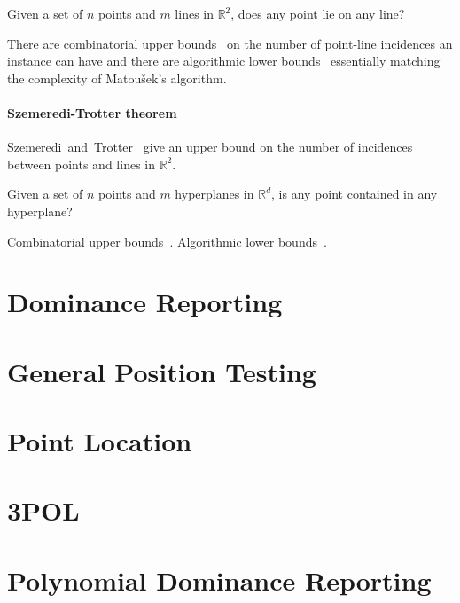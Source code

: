 \begin{problem}
	Given a set of $n$ points and $m$ lines in $\mathbb{R}^2$,
	does any point lie on any line?
\end{problem}
There are combinatorial upper bounds~\cite{ST83} on the number of point-line
incidences an instance can have and there are algorithmic lower
bounds~\cite{Er96} essentially matching the complexity of Matou\v{s}ek's algorithm.

\paragraph{Szemeredi-Trotter theorem}
Szemeredi~and~Trotter~\cite{ST83} give an upper bound on the number of
incidences between points and lines in $\mathbb{R}^2$.


\begin{problem}
	Given a set of $n$ points and $m$ hyperplanes in $\mathbb{R}^d$,
	is any point contained in any hyperplane?
\end{problem}

Combinatorial upper bounds~\cite{AA92,CEGSW90}.
Algorithmic lower bounds~\cite{BK03}.

\section{Dominance Reporting}

\section{General Position Testing}

\section{Point Location}

\section{3POL}

\section{Polynomial Dominance Reporting}
